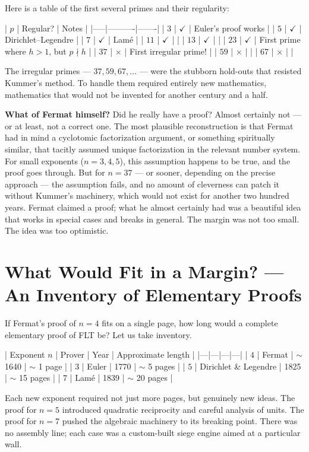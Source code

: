 \documentclass[11pt,twoside,openright]{book}
\theoremstyle{definition}
\theoremstyle{remark}
\begin{document}
Here is a table of the first several primes and their regularity:

| $p$ | Regular? | Notes |
|-----|----------|-------|
| $3$ | $\checkmark$ | Euler's proof works |
| $5$ | $\checkmark$ | Dirichlet--Legendre |
| $7$ | $\checkmark$ | Lam\'e |
| $11$ | $\checkmark$ | |
| $13$ | $\checkmark$ | |
| $23$ | $\checkmark$ | First prime where $h > 1$, but $p \nmid h$ |
| $37$ | $\times$ | First irregular prime! |
| $59$ | $\times$ | |
| $67$ | $\times$ | |

The irregular primes --- $37, 59, 67, \ldots$ --- were the stubborn hold-outs that resisted Kummer's method. To handle them required entirely new mathematics, mathematics that would not be invented for another century and a half.


\textbf{What of Fermat himself?} Did he really have a proof? Almost certainly not --- or at least, not a correct one. The most plausible reconstruction is that Fermat had in mind a cyclotomic factorization argument, or something spiritually similar, that tacitly assumed unique factorization in the relevant number system. For small exponents ($n = 3, 4, 5$), this assumption happens to be true, and the proof goes through. But for $n = 37$ --- or sooner, depending on the precise approach --- the assumption fails, and no amount of cleverness can patch it without Kummer's machinery, which would not exist for another two hundred years. Fermat claimed a proof; what he almost certainly had was a beautiful idea that works in special cases and breaks in general. The margin was not too small. The idea was too optimistic.


\section{What Would Fit in a Margin? --- An Inventory of Elementary Proofs}

If Fermat's proof of $n = 4$ fits on a single page, how long would a complete elementary proof of FLT be? Let us take inventory.

| Exponent $n$ | Prover | Year | Approximate length |
|---|---|---|---|
| $4$ | Fermat | $\sim$1640 | $\sim$ 1 page |
| $3$ | Euler | 1770 | $\sim$ 5 pages |
| $5$ | Dirichlet \& Legendre | 1825 | $\sim$ 15 pages |
| $7$ | Lam\'e | 1839 | $\sim$ 20 pages |

Each new exponent required not just more pages, but genuinely new ideas. The proof for $n = 5$ introduced quadratic reciprocity and careful analysis of units. The proof for $n = 7$ pushed the algebraic machinery to its breaking point. There was no assembly line; each case was a custom-built siege engine aimed at a particular wall.
\end{document}
